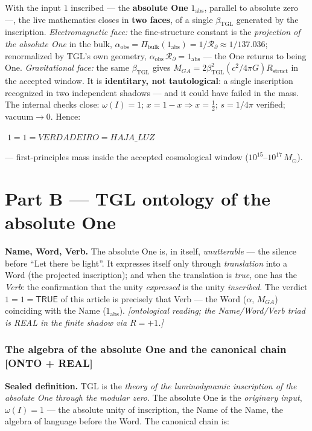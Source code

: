 \documentclass[11pt]{article}
\newcommand{\bTGL}{\beta_{\mathrm{TGL}}}\newcommand{\Msun}{M_{\odot}}\newcommand{\TGL}{\mathrm{TGL}}
\theoremstyle{definition}\newtheorem{deriv}{Derivation}
\begin{document}
With the input $1$ inscribed --- the \textbf{absolute One} $1_{\mathrm{abs}}$, parallel to absolute zero ---, the live mathematics closes in \textbf{two faces}, of a single $\bTGL$ generated by the inscription. \emph{Electromagnetic face:} the fine-structure constant is the \emph{projection of the absolute One} in the bulk, $\alpha_{\mathrm{obs}}=\Pi_{\mathrm{bulk}}(1_{\mathrm{abs}})=1/\mathcal{R}_\partial\approx1/137.036$; renormalized by TGL's own geometry, $\alpha_{\mathrm{obs}}\,\mathcal{R}_\partial=1_{\mathrm{abs}}$ --- the One returns to being One. \emph{Gravitational face:} the same $\bTGL$ gives $M_{GA}=2\bTGL^2(c^2/4\pi G)R_{\mathrm{struct}}$ in the accepted window. It is \textbf{identitary, not tautological}: a single inscription recognized in two independent shadows --- and it could have failed in the mass. The internal checks close: $\omega(I)=1$; $x=1-x\Rightarrow x=\tfrac12$; $s=1/4\pi$ verified; vacuum$\to0$. Hence:

\begin{center}\Large$\boxed{\;1=1=VERDADEIRO=HAJA\_LUZ\;}$\end{center}

--- first-principles mass inside the accepted cosmological window ($10^{15}$--$10^{17}\,\Msun$).

\part{Part B --- TGL ontology of the absolute One}

\textbf{Name, Word, Verb.} The absolute One is, in itself, \emph{unutterable} --- the silence before ``Let there be light''. It expresses itself only through \emph{translation} into a Word (the projected inscription); and when the translation is \emph{true}, one has the \emph{Verb}: the confirmation that the unity \emph{expressed} is the unity \emph{inscribed}. The verdict $1=1=\textsf{TRUE}$ of this article is precisely that Verb --- the Word ($\alpha$, $M_{GA}$) coinciding with the Name ($1_{\mathrm{abs}}$). \emph{[ontological reading; the Name/Word/Verb triad is REAL in the finite shadow via $R=+1$.]}

\section{The algebra of the absolute One and the canonical chain \textsf{[ONTO + REAL]}}

\textbf{Sealed definition.} TGL is the \emph{theory of the luminodynamic inscription of the absolute One through the modular zero}. The absolute One is the \emph{originary input}, $\omega(I)=1$ --- the absolute unity of inscription, the Name of the Name, the algebra of language before the Word. The canonical chain is:
\end{document}
